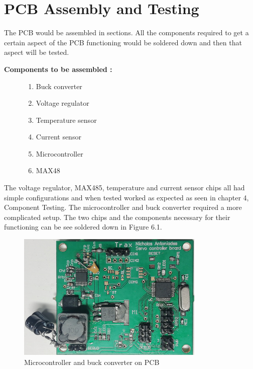 
\chapter{PCB Assembly and Testing}
\vspace{-14mm}
The PCB would be assembled in sections.  All the components required to get a certain aspect of the PCB functioning would be soldered down and then that aspect will be tested. 

\vspace{-1mm}
\textbf{Components to be assembled :}
\begin{figure}[H]
        \begin{enumerate}
        \setlength{\itemsep}{-1.5mm}
        \item Buck converter
        \item Voltage regulator
        \item Temperature sensor
        \item Current sensor
        \item Microcontroller
        \item MAX48
    \end{enumerate}
\end{figure}

\vspace{-8mm}
The voltage regulator, MAX485, temperature and current sensor chips all had simple configurations and when tested worked as expected as seen in chapter 4, Component Testing. The microcontroller and buck converter required a more complicated setup. The two chips and the components necessary for their functioning can be see soldered down in Figure 6.1.

\vspace{2mm}
\begin{figure}[H]
\centering
\includegraphics[width=0.8\textwidth]{Soldered_PCB.jpg}
\vspace{-1mm}
\caption{Microcontroller and buck converter on PCB}
\end{figure} 
\vspace{-5mm}

